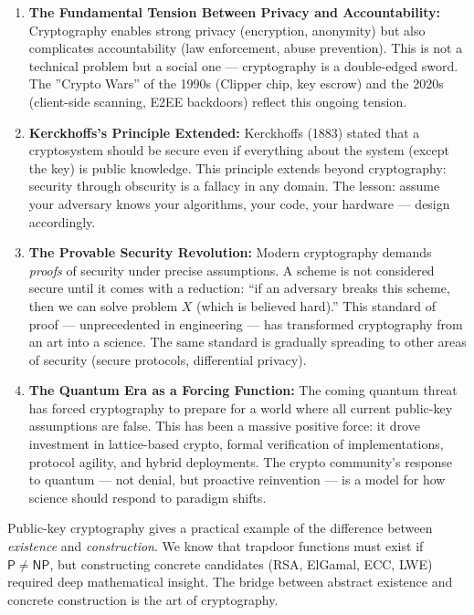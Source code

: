\begin{enumerate}
\item \textbf{The Fundamental Tension Between Privacy and Accountability:} Cryptography enables strong privacy (encryption, anonymity) but also complicates accountability (law enforcement, abuse prevention). This is not a technical problem but a social one — cryptography is a double-edged sword. The ''Crypto Wars'' of the 1990s (Clipper chip, key escrow) and the 2020s (client-side scanning, E2EE backdoors) reflect this ongoing tension.

\item \textbf{Kerckhoffs's Principle Extended:} Kerckhoffs (1883) stated that a cryptosystem should be secure even if everything about the system (except the key) is public knowledge. This principle extends beyond cryptography: security through obscurity is a fallacy in any domain. The lesson: assume your adversary knows your algorithms, your code, your hardware — design accordingly.

\item \textbf{The Provable Security Revolution:} Modern cryptography demands \emph{proofs} of security under precise assumptions. A scheme is not considered secure until it comes with a reduction: ``if an adversary breaks this scheme, then we can solve problem $X$ (which is believed hard).'' This standard of proof — unprecedented in engineering — has transformed cryptography from an art into a science. The same standard is gradually spreading to other areas of security (secure protocols, differential privacy).

\item \textbf{The Quantum Era as a Forcing Function:} The coming quantum threat has forced cryptography to prepare for a world where all current public-key assumptions are false. This has been a massive positive force: it drove investment in lattice-based crypto, formal verification of implementations, protocol agility, and hybrid deployments. The crypto community's response to quantum — not denial, but proactive reinvention — is a model for how science should respond to paradigm shifts.
\end{enumerate}

Public-key cryptography gives a practical example of the difference between \emph{existence} and \emph{construction}. We know that trapdoor functions must exist if $\mathsf{P} \neq \mathsf{NP}$, but constructing concrete candidates (RSA, ElGamal, ECC, LWE) required deep mathematical insight. The bridge between abstract existence and concrete construction is the art of cryptography.

